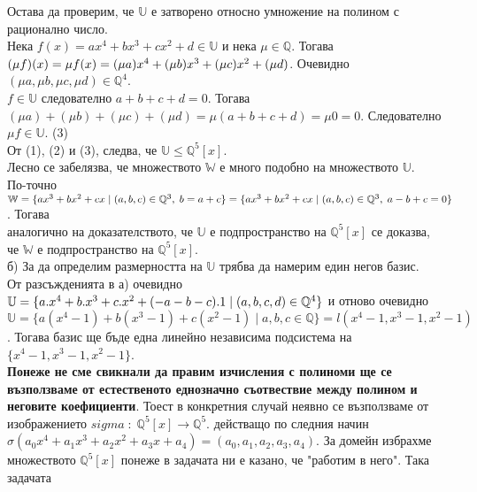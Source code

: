 \documentclass[a4paper, 12pt, oneside]{article}
\begin{document}
Остава да проверим, че \(\mathbb{U}\) е затворено относно умножение на полином с рационално число. \\
Нека \(f(x) = ax^4 + bx^3 + cx^2 + d \in \mathbb{U}\) и нека \(\mu \in \mathbb{{Q}}\). Тогава \((\mu f)(x) = \mu f(x) = \\
(\mu a)x^4 + (\mu b)x^3 + (\mu c)x^2 + (\mu d)\). Очевидно \((\mu a, \mu b, \mu c, \mu d) \in \mathbb{Q}^4\). \\
\(f \in \mathbb{U}\) следователно \(a + b + c + d = 0\). Тогава \\
\((\mu a) + (\mu b) + (\mu c) + (\mu d) = \mu (a + b + c + d) = \mu 0 = 0\). Следователно \(\mu f \in \mathbb{U}\). (3) \\
От (1), (2) и (3), следва, че \(\mathbb{U} \leq \mathbb{Q}^5[x]\). \\
Лесно се забелязва, че множеството \(\mathbb{W}\) е много подобно на множеството \(\mathbb{U}\). \\
По-точно \(\mathbb{W} = \{ax^3 + bx^2 + cx \; | \; (a, b, c) \in \mathbb{Q}^3, \; b = a + c\} = \\
\{ax^3 + bx^2 + cx \; | \; (a, b, c) \in \mathbb{Q}^3, \; a - b + c = 0\}\). Тогава \\
аналогично на доказателството, че \(\mathbb{U}\) е подпространство на \(\mathbb{Q}^5[x]\) се доказва, \\
че  \(\mathbb{W}\) е подпространство на \(\mathbb{Q}^5[x]\). \\
б) За да определим размерността на \(\mathbb{U}\) трябва да намерим един негов базис. \\
От разсъжденията в а) очевидно \(\mathbb{U} = \\
\{a.x^4 + b.x^3 + c.x^2 + (-a -b - c).1 \; | \; (a, b, c, d) \in \mathbb{Q}^4\}\) и отново очевидно \\
\(\mathbb{U} = \{a(x^4 - 1) + b(x^3 - 1) + c(x^2 - 1) \; | \; a, b, c \in \mathbb{Q}\} = l(x^4 - 1, x^3 - 1, x^2 - 1)\).
Тогава базис ще бъде една линейно независима подсистема на \(\{x^4 - 1, x^3 - 1, x^2 - 1\}\). \\
\textbf{Понеже не сме свикнали да правим изчисления с полиноми ще се възползваме от естественото еднозначно съотвествие между полином и неговите коефициенти}.
Тоест в конкретния случай неявно се възползваме от изображението \(sigma \; : \; \mathbb{Q}^5[x] \to \mathbb{Q}^5\).
действащо по следния начин \(\sigma(a_0x^4 + a_1x^3 + a_2x^2 + a_3x + a_4) = (a_0, a_1, a_2, a_3, a_4)\).
За домейн избрахме множеството \(\mathbb{Q}^5[x]\) понеже в задачата ни е казано, че "работим в него". Така задачата \\
\end{document}
